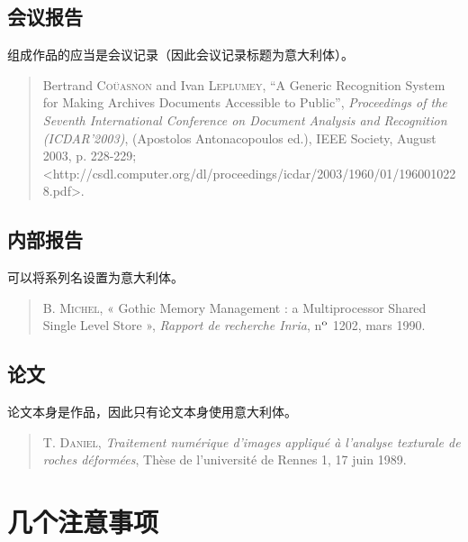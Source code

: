 \subsection{会议报告}

组成作品的应当是会议记录（因此会议记录标题为意大利体）。

\begin{quote}
    Bertrand \textsc{Coüasnon} and Ivan \textsc{Leplumey}, “A Generic Recognition System for Making Archives Documents Accessible to Public”, \emph{Proceedings of the Seventh International Conference on Document Analysis and Recognition (ICDAR’2003)}, (Apostolos Antonacopoulos ed.), IEEE Society, August 2003, p. 228-229; <http://\linebreak csdl.computer.org/dl/proceedings/icdar/2003/1960/01/\linebreak1960010228.pdf>.
\end{quote}

\subsection{内部报告}

可以将系列名设置为意大利体。

\begin{quote}
    B. \textsc{Michel}, « Gothic Memory Management : a Multiprocessor Shared Single Level Store », \emph{Rapport de recherche Inria}, n$^{\rm o}$ 1202, mars 1990.
\end{quote}

\subsection{论文}

论文本身是作品，因此只有论文本身使用意大利体。

\begin{quote}
    T. \textsc{Daniel}, \emph{Traitement numérique d’images appliqué à l’analyse texturale de roches déformées}, Thèse de l’université de Rennes 1, 17 juin 1989.
\end{quote}

\section{几个注意事项}

